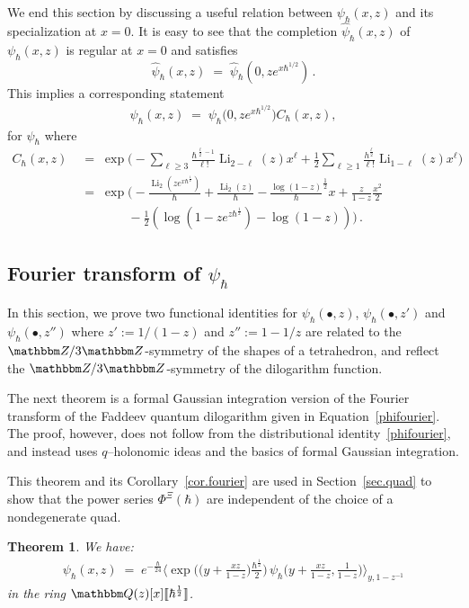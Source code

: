 \documentclass[12pt,reqno]{amsart}
\newtheorem{theorem}{Theorem}[section]
\theoremstyle{definition}
\def\BZ{\mathbbm Z}
\def\BQ{\mathbbm Q}
\def\be{\begin{equation}}
\def\ee{\end{equation}}
\newcommand{\bea}{\begin{equation}\begin{aligned}}
\newcommand{\eea}{\end{aligned}\end{equation}}
\renewcommand{\=}{\;=\;}
\newcommand{\Li}{\operatorname{Li}}
\newcommand{\hroot}{\hbar^{\frac{1}{2}}}
\newcommand{\ezh}{e^{z\hbar^{\frac 12}}}
\begin{document}
We end this section by discussing a useful relation between $\psi_\hbar(x,z)$
and its specialization at $x=0$. It is easy to see that the completion
$\widehat{\psi}_{\hbar}(x,z)$ of $\psi_\hbar(x,z)$ is regular at $x=0$ and satisfies
\be
\widehat{\psi}_{\hbar}(x,z)
\=
\widehat{\psi}_{\hbar}(0,ze^{x\hbar^{1/2}})\,.
\ee
This implies a corresponding statement
\bea
\label{eq.psid}
\psi_\hbar(x,z)
\= \psi_\hbar\big(0,ze^{x\hbar^{1/2}}\big)C_\hbar(x,z),
\eea
for $\psi_{\hbar}$ 
where
\bea
\label{Cdef}
C_\hbar(x,z) &\= \exp\Big(\!-\sum_{\ell\geq 3}
\frac{\hbar^{\frac \ell 2 -1}}{\ell!}\Li_{2-\ell}(z)x^\ell 
+\frac 1 2 \sum_{\ell\geq 1} \frac{h^{\frac \ell2}}{\ell!}\Li_{1-\ell}(z)x^\ell\Big)\\
&\=\exp\Big(\!-\frac{\Li_2(ze^{x\hroot})}\hbar+\frac{\Li_2(z)}\hbar
-\frac{\log(1-z)}\hroot x + \frac{z}{1-z}\frac {x^2}2\\
&\qquad\qquad-\frac 1 2 (\log(1-z\ezh) - \log(1-z))\Big)\,.
\eea

\subsection{\texorpdfstring{Fourier transform of $\psi_\hbar$}{Fourier transform of psi}}
\label{sub.fourier}

In this section, we prove two functional identities for $\psi_{\hbar}(\bullet,z)$,
$\psi_{\hbar}(\bullet,z')$ and $\psi_{\hbar}(\bullet,z'')$
where $z':=1/(1-z)$ and $z'':=1-1/z$ are related to the $\BZ/3\BZ$-symmetry of
the shapes of a tetrahedron, and reflect the $\BZ/3\BZ$-symmetry of the dilogarithm
function.

The next theorem is a formal Gaussian integration version of
the Fourier transform of the Faddeev quantum dilogarithm given in
Equation~\eqref{phifourier}. The proof, however, does not follow from the
distributional identity~\eqref{phifourier}, and instead uses $q$--holonomic ideas
and the basics of formal Gaussian integration. 

This theorem and its Corollary~\ref{cor.fourier} are used in Section~\ref{sec.quad}
to show that the power series $\Phi^\Xi(\hbar)$ are independent of the choice of
a nondegenerate quad.

\begin{theorem}
\label{thm.fourier}
We have:
\bea
\label{eq.fourier}
\psi_\hbar (x,z)
\=e^{-\frac{\hbar}{24}}\Big\langle
\exp\Big(
\Big(y+\frac{xz}{1-z}\Big) \frac{\hbar^{\frac 1 2}}{2}\Big)\,
\psi_\hbar\Big(y+\frac{xz}{1-z}, \frac 1 {1-z}
\Big)
\Big\rangle_{y,1-z^{-1}} 
\eea
in the ring $\BQ(z)[x]\llbracket\hroot\rrbracket$.
\end{theorem}
\end{document}
